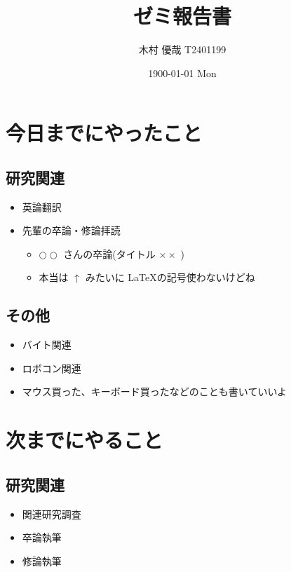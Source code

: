 \documentclass[uplatex, onecolumn, 10pt]{jsarticle}
\begin{document}
\title{\vspace{-40mm}\bf{\LARGE{ゼミ報告書}}}
\author{\vspace{-40mm}木村 優哉  T2401199}
\date{1900-01-01 Mon}
\maketitle


\section{今日までにやったこと}

\subsection*{研究関連}
\begin{itemize}
	\item 英論翻訳
	\item 先輩の卒論・修論拝読
	\begin{itemize}
        \item $\bigcirc \bigcirc$ さんの卒論(タイトル $\times \times$ )
        \item 本当は $\uparrow$ みたいに \LaTeX の記号使わないけどね
    \end{itemize}
\end{itemize}

\subsection*{その他}
\begin{itemize}
	\item バイト関連
	\item ロボコン関連
	\item マウス買った、キーボード買ったなどのことも書いていいよ
\end{itemize}



\section{次までにやること}

\subsection*{研究関連}
\begin{itemize}
	\item 関連研究調査
    \item 卒論執筆
	\item 修論執筆
\end{itemize}
\end{document}
